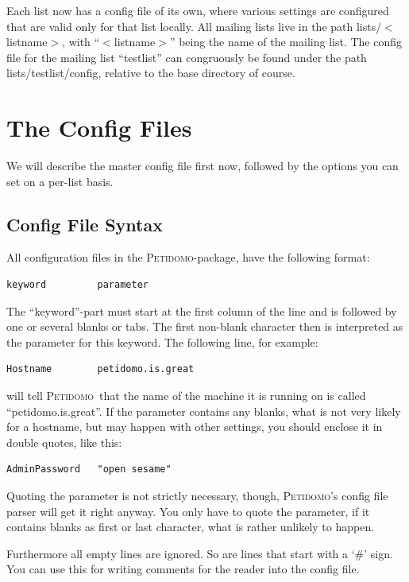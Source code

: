 \documentclass[a4paper,10pt]{scrreprt}
\newcommand{\Petidomo}{{\scshape Peti\-domo}}
\newcommand{\file}[1]{{\sf #1}}
\begin{document}
Each list now has a config file of its own, where various settings are
configured that are valid only for that list locally. All mailing
lists live in the path \file{lists/$<$listname$>$}, with ``$<$listname$>$''
being the name of the mailing list. The config file for the mailing
list ``testlist'' can congruously be found under the path
\file{lists/testlist/config}, relative to the base directory of
course.

\section{The Config Files}

We will describe the master config file first now, followed by the
options you can set on a per-list basis.

\subsection{Config File Syntax}

All configuration files in the \Petidomo-package\label{Config file
format}, have the following format:
\begin{verbatim}
keyword         parameter
\end{verbatim}

The ``keyword''-part must start at the first column of the line and is
followed by one or several blanks or tabs. The first non-blank
character then is interpreted as the parameter for this keyword. The
following line, for example:
\begin{verbatim}
Hostname        petidomo.is.great
\end{verbatim}
will tell \Petidomo\ that the name of the machine it is running on is
called ``petidomo.is.great''. If the parameter contains any blanks,
what is not very likely for a hostname, but may happen with other
settings, you should enclose it in double quotes, like this:
\begin{verbatim}
AdminPassword   "open sesame"
\end{verbatim}

Quoting the parameter is not strictly necessary, though, \Petidomo's
config file parser will get it right anyway. You only have to quote
the parameter, if it contains blanks as first or last character, what
is rather unlikely to happen.

Furthermore all empty lines are ignored. So are lines that start with
a `\#' sign. You can use this for writing comments for the reader into
the config file.
\end{document}
